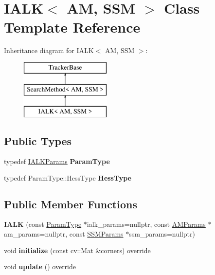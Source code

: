 \hypertarget{classIALK}{\section{I\-A\-L\-K$<$ A\-M, S\-S\-M $>$ Class Template Reference}
\label{classIALK}
}
Inheritance diagram for I\-A\-L\-K$<$ A\-M, S\-S\-M $>$\-:\begin{figure}[H]
\begin{center}
\leavevmode
\includegraphics[height=3.000000cm]{classIALK}
\end{center}
\end{figure}
\subsection*{Public Types}
\begin{DoxyCompactItemize}
\item 
\hypertarget{classIALK_abf0584c933a8ee778a08df64eddf95cb}{typedef \hyperlink{structIALKParams}{I\-A\-L\-K\-Params} {\bfseries Param\-Type}}\label{classIALK_abf0584c933a8ee778a08df64eddf95cb}

\item 
\hypertarget{classIALK_add56895de517b7b2cd6619a384ef432a}{typedef Param\-Type\-::\-Hess\-Type {\bfseries Hess\-Type}}\label{classIALK_add56895de517b7b2cd6619a384ef432a}

\end{DoxyCompactItemize}
\subsection*{Public Member Functions}
\begin{DoxyCompactItemize}
\item 
\hypertarget{classIALK_ab051d8ec7bfdb2272c5831ea4cd66a65}{{\bfseries I\-A\-L\-K} (const \hyperlink{structIALKParams}{Param\-Type} $\ast$ialk\-\_\-params=nullptr, const \hyperlink{structAMParams}{A\-M\-Params} $\ast$am\-\_\-params=nullptr, const \hyperlink{structSSMParams}{S\-S\-M\-Params} $\ast$ssm\-\_\-params=nullptr)}\label{classIALK_ab051d8ec7bfdb2272c5831ea4cd66a65}

\item 
\hypertarget{classIALK_afa975ae63c0f6713b7af349541926d1c}{void {\bfseries initialize} (const cv\-::\-Mat \&corners) override}\label{classIALK_afa975ae63c0f6713b7af349541926d1c}

\item 
\hypertarget{classIALK_ac2bc288bb64c904ac4e7735799e60c6f}{void {\bfseries update} () override}\label{classIALK_ac2bc288bb64c904ac4e7735799e60c6f}

\end{DoxyCompactItemize}
